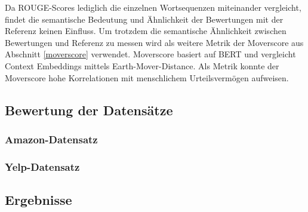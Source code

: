 Da ROUGE-Scores lediglich die einzelnen Wortsequenzen miteinander vergleicht, findet die semantische Bedeutung und Ähnlichkeit der Bewertungen mit der Referenz keinen Einfluss.
Um trotzdem die semantische Ähnlichkeit zwischen Bewertungen und Referenz zu messen wird als weitere Metrik der Moverscore aus Abschnitt \ref{moverscore} verwendet.
Moverscore basiert auf BERT und vergleicht Context Embeddings mittels Earth-Mover-Distance. Als Metrik konnte der Moverscore hohe Korrelationen mit menschlichem Urteilsvermögen aufweisen.


\subsection{Bewertung der Datensätze}

\subsubsection{Amazon-Datensatz}

\subsubsection{Yelp-Datensatz}

\subsection{Ergebnisse}

